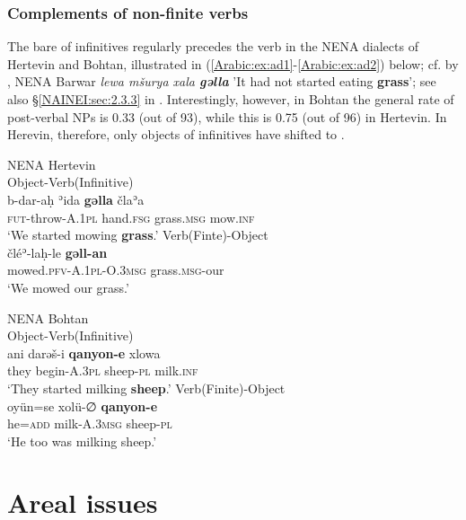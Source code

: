 \documentclass[output=paper,colorlinks,citecolor=brown,draftmode]{langscibook}
\begin{document}
\subsubsection{Complements of non-finite verbs}

The bare  of infinitives regularly precedes the verb in the NENA dialects of Hertevin and Bohtan, illustrated in (\ref{Arabic:ex:ad1}-\ref{Arabic:ex:ad2}) below; cf. by , NENA Barwar \citep[B5:§175]{Khan2008Barwar} \textit{lewa mšurya xala \textbf{gəlla}} 'It had not started eating \textbf{grass}'; see also §\ref{NAINEI:sec:2.3.3} in . Interestingly, however, in Bohtan the general rate of post-verbal  NPs is 0.33 (out of 93), while this is 0.75 (out of 96) in Hertevin. In Herevin, therefore, only objects of infinitives have shifted to .

\ea\label{Arabic:ex:ad1}
NENA Hertevin \citep[§318-§319]{Jastrow1988NAHertevin} \\
\ea\label{Arabic:ex:ad1a}
Object-Verb(Infinitive)\\
\gll b-dar-aḥ ʾida  \textbf{gəlla} člaʾa\\
\textsc{fut-}throw-\textsc{A.1pl} hand\textsc{.fsg} grass\textsc{.msg} mow\textsc{.inf}\\
\glt `We started mowing \textbf{grass}.' 
\ex\label{Arabic:ex:ad1b}
Verb(Finte)-Object\\
\gll čléʾ-laḥ-le \textbf{gəll-an}\\
mowed\textsc{.pfv}-\textsc{A.1pl}-\textsc{O.3msg} grass\textsc{.msg}-our\\
\glt `We mowed our grass.'
\z
\z

\ea\label{Arabic:ex:ad2}
NENA Bohtan \citep[§118]{Jastrow1988NAHertevin} \\
\ea\label{Arabic:ex:ad2a}
Object-Verb(Infinitive)\\
\gll ani darəš-i  \textbf{qanyon-e} xlowa\\
they begin-\textsc{A.3pl} sheep-\textsc{pl} milk\textsc{.inf}\\
\glt `They started milking \textbf{sheep}.' 
\ex\label{Arabic:ex:ad2b}
Verb(Finite)-Object\\
\gll oyün=se xolü-∅ \textbf{qanyon-e}\\
he=\textsc{add} milk-\textsc{A.3msg} sheep-\textsc{pl}\\
\glt `He too was milking sheep.'
\z
\z


\section{Areal issues}
\end{document}
